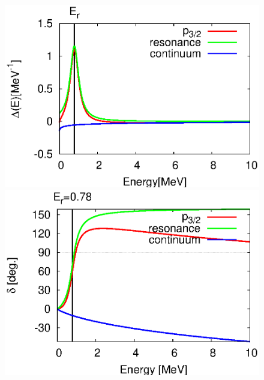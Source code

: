 \documentclass[english,a4paper]{jsarticle}
\begin{document}
\begin{figure}
  \begin{minipage}{0.5\textwidth}
    \begin{flushright}
      \includegraphics[width=1.0\textwidth,clip]{../cld/allcld/allcld_p3_100MeV.eps}
    \end{flushright}
  \end{minipage}
  \begin{minipage}{0.5\textwidth}
    \begin{flushright}
      \includegraphics[width=1.0\textwidth,clip]{../phs/allphs/allphs_p3_100MeV.eps}
    \end{flushright}
  \end{minipage}
\end{figure}
\end{document}
